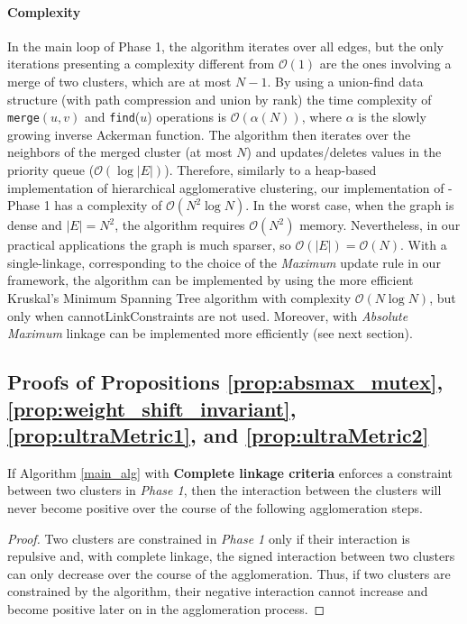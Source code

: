 \paragraph*{Complexity} 
In the main loop of Phase 1, the algorithm iterates over all edges, but the only iterations presenting a complexity different from $\mathcal{O}(1)$ are the ones involving a merge of two clusters, which are at most $N-1$. By using a union-find data structure (with path compression and union by rank) the time complexity of \texttt{merge}$(u, v)$ and \texttt{find}($u$) operations is $\mathcal{O}(\alpha(N))$, where $\alpha$ is the slowly growing inverse Ackerman function. The algorithm then iterates over the neighbors of the merged cluster (at most $N$) and updates/deletes values in the priority queue ($\mathcal{O}(\log |E|)$). 
Therefore, 
similarly to a heap-based implementation of hierarchical agglomerative clustering, our implementation of \algname{} - Phase 1 has a complexity of $\mathcal{O}(N^2 \log N)$. In the worst case, when the graph is dense and $|E|=N^2$, the algorithm requires $\mathcal{O}(N^2)$ memory. Nevertheless, in our practical applications the graph is much sparser, so $\mathcal{O}(|E|)=\mathcal{O}(N)$. 
With a single-linkage, corresponding to the choice of the \emph{Maximum} update rule in our framework, the algorithm can be implemented by using the more efficient Kruskal's Minimum Spanning Tree algorithm with complexity $\mathcal{O}(N \log N)$, but only when cannotLinkConstraints are not used. 
Moreover, \algname{} with \emph{Absolute Maximum} linkage can be implemented more efficiently (see next section). %




\subsection{Proofs of Propositions \ref{prop:absmax_mutex}, \ref{prop:weight_shift_invariant}, \ref{prop:ultraMetric1}, and \ref{prop:ultraMetric2}}
\label{sec:proposition_proofs}

\begin{lemma} \label{lemma:absMax_and_complete_not_positive}
If \algname{} Algorithm \ref{main_alg} with \textbf{Complete linkage criteria} enforces a constraint between two clusters in \emph{Phase 1}, then the interaction between the clusters will never become positive over the course of the following agglomeration steps.
\end{lemma}
\begin{proof}
Two clusters are constrained in \emph{Phase 1} only if their interaction is repulsive and, with complete linkage,  the signed interaction between two clusters can only decrease over the course of the agglomeration. Thus, if two clusters are constrained by the algorithm, their negative interaction cannot increase and become positive later on in the agglomeration process.
\end{proof}

